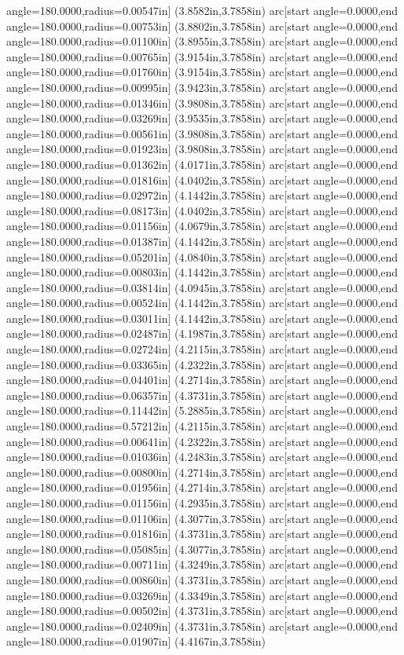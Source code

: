 angle=180.0000,radius=0.00547in] (3.8582in,3.7858in) arc[start angle=0.0000,end angle=180.0000,radius=0.00753in] (3.8802in,3.7858in) arc[start angle=0.0000,end angle=180.0000,radius=0.01100in] (3.8955in,3.7858in) arc[start angle=0.0000,end angle=180.0000,radius=0.00765in] (3.9154in,3.7858in) arc[start angle=0.0000,end angle=180.0000,radius=0.01760in] (3.9154in,3.7858in) arc[start angle=0.0000,end angle=180.0000,radius=0.00995in] (3.9423in,3.7858in) arc[start angle=0.0000,end angle=180.0000,radius=0.01346in] (3.9808in,3.7858in) arc[start angle=0.0000,end angle=180.0000,radius=0.03269in] (3.9535in,3.7858in) arc[start angle=0.0000,end angle=180.0000,radius=0.00561in] (3.9808in,3.7858in) arc[start angle=0.0000,end angle=180.0000,radius=0.01923in] (3.9808in,3.7858in) arc[start angle=0.0000,end angle=180.0000,radius=0.01362in] (4.0171in,3.7858in) arc[start angle=0.0000,end angle=180.0000,radius=0.01816in] (4.0402in,3.7858in) arc[start angle=0.0000,end angle=180.0000,radius=0.02972in] (4.1442in,3.7858in) arc[start angle=0.0000,end angle=180.0000,radius=0.08173in] (4.0402in,3.7858in) arc[start angle=0.0000,end angle=180.0000,radius=0.01156in] (4.0679in,3.7858in) arc[start angle=0.0000,end angle=180.0000,radius=0.01387in] (4.1442in,3.7858in) arc[start angle=0.0000,end angle=180.0000,radius=0.05201in] (4.0840in,3.7858in) arc[start angle=0.0000,end angle=180.0000,radius=0.00803in] (4.1442in,3.7858in) arc[start angle=0.0000,end angle=180.0000,radius=0.03814in] (4.0945in,3.7858in) arc[start angle=0.0000,end angle=180.0000,radius=0.00524in] (4.1442in,3.7858in) arc[start angle=0.0000,end angle=180.0000,radius=0.03011in] (4.1442in,3.7858in) arc[start angle=0.0000,end angle=180.0000,radius=0.02487in] (4.1987in,3.7858in) arc[start angle=0.0000,end angle=180.0000,radius=0.02724in] (4.2115in,3.7858in) arc[start angle=0.0000,end angle=180.0000,radius=0.03365in] (4.2322in,3.7858in) arc[start angle=0.0000,end angle=180.0000,radius=0.04401in] (4.2714in,3.7858in) arc[start angle=0.0000,end angle=180.0000,radius=0.06357in] (4.3731in,3.7858in) arc[start angle=0.0000,end angle=180.0000,radius=0.11442in] (5.2885in,3.7858in) arc[start angle=0.0000,end angle=180.0000,radius=0.57212in] (4.2115in,3.7858in) arc[start angle=0.0000,end angle=180.0000,radius=0.00641in] (4.2322in,3.7858in) arc[start angle=0.0000,end angle=180.0000,radius=0.01036in] (4.2483in,3.7858in) arc[start angle=0.0000,end angle=180.0000,radius=0.00800in] (4.2714in,3.7858in) arc[start angle=0.0000,end angle=180.0000,radius=0.01956in] (4.2714in,3.7858in) arc[start angle=0.0000,end angle=180.0000,radius=0.01156in] (4.2935in,3.7858in) arc[start angle=0.0000,end angle=180.0000,radius=0.01106in] (4.3077in,3.7858in) arc[start angle=0.0000,end angle=180.0000,radius=0.01816in] (4.3731in,3.7858in) arc[start angle=0.0000,end angle=180.0000,radius=0.05085in] (4.3077in,3.7858in) arc[start angle=0.0000,end angle=180.0000,radius=0.00711in] (4.3249in,3.7858in) arc[start angle=0.0000,end angle=180.0000,radius=0.00860in] (4.3731in,3.7858in) arc[start angle=0.0000,end angle=180.0000,radius=0.03269in] (4.3349in,3.7858in) arc[start angle=0.0000,end angle=180.0000,radius=0.00502in] (4.3731in,3.7858in) arc[start angle=0.0000,end angle=180.0000,radius=0.02409in] (4.3731in,3.7858in) arc[start angle=0.0000,end angle=180.0000,radius=0.01907in] (4.4167in,3.7858in) 